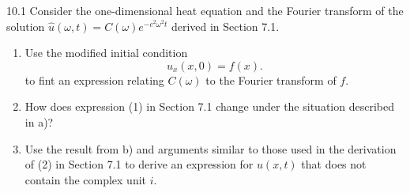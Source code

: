 \begin{problem}{10.1}
  Consider the one-dimensional heat equation and the Fourier transform of the solution $\hat{u}(\omega, t) = C(\omega)e^{-c^2\omega^2 t}$ derived in Section 7.1.

  \begin{enumerate}[label=\alph*)]
    \item Use the modified initial condition
      \begin{equation*}
        u_x(x,0) = f(x)
      .\end{equation*}
      to fint an expression relating $C(\omega)$ to the Fourier transform of $f$.
    \item How does expression (1) in Section 7.1 change under the situation described in a)?
    \item Use the result from b) and arguments similar to those used in the derivation of (2) in Section 7.1 to derive an expression for $u(x,t)$ that does not contain the complex unit $i$.
  \end{enumerate}
\end{problem}

